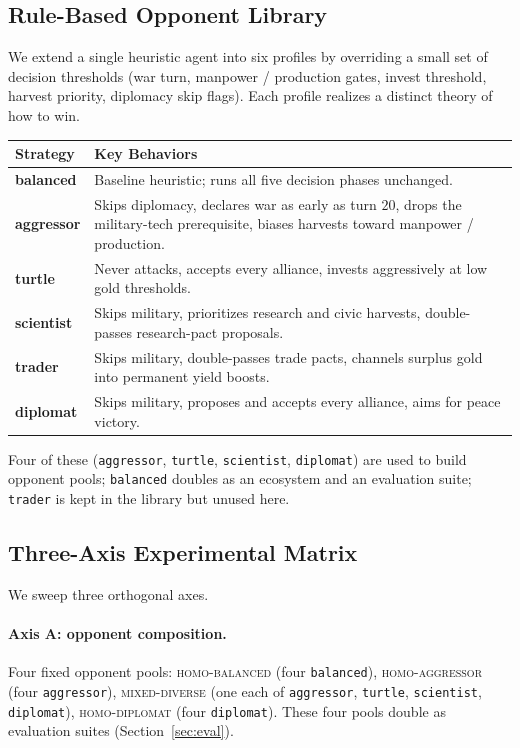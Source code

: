 \subsection{Rule-Based Opponent Library}
\label{sec:opponents}

We extend a single heuristic agent into six profiles by overriding a small
set of decision thresholds (war turn, manpower / production gates, invest
threshold, harvest priority, diplomacy skip flags). Each profile realizes a
distinct theory of how to win.

\begin{center}
\small
\begin{tabular}{lp{11.5cm}}
\toprule
\textbf{Strategy} & \textbf{Key Behaviors} \\
\midrule
\textbf{balanced}   & Baseline heuristic; runs all five decision phases unchanged. \\
\textbf{aggressor}  & Skips diplomacy, declares war as early as turn $20$, drops the military-tech prerequisite, biases harvests toward manpower / production. \\
\textbf{turtle}     & Never attacks, accepts every alliance, invests aggressively at low gold thresholds. \\
\textbf{scientist}  & Skips military, prioritizes research and civic harvests, double-passes research-pact proposals. \\
\textbf{trader}     & Skips military, double-passes trade pacts, channels surplus gold into permanent yield boosts. \\
\textbf{diplomat}   & Skips military, proposes and accepts every alliance, aims for peace victory. \\
\bottomrule
\end{tabular}
\end{center}

Four of these (\texttt{aggressor}, \texttt{turtle}, \texttt{scientist},
\texttt{diplomat}) are used to build opponent pools; \texttt{balanced}
doubles as an ecosystem and an evaluation suite; \texttt{trader} is kept
in the library but unused here.

\subsection{Three-Axis Experimental Matrix}
\label{sec:matrix}

We sweep three orthogonal axes.

\paragraph{Axis A: opponent composition.}
Four fixed opponent pools:
\textsc{homo-balanced} (four \texttt{balanced}),
\textsc{homo-aggressor} (four \texttt{aggressor}),
\textsc{mixed-diverse} (one each of
\texttt{aggressor}, \texttt{turtle}, \texttt{scientist}, \texttt{diplomat}),
\textsc{homo-diplomat} (four \texttt{diplomat}). These four pools double as
evaluation suites (Section~\ref{sec:eval}).


